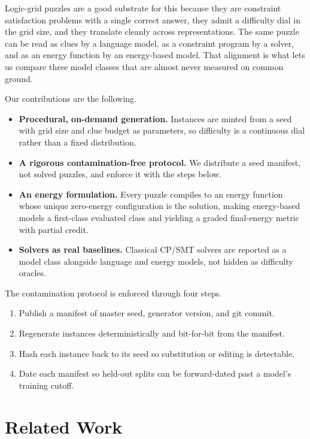 \documentclass[11pt]{article}
\begin{document}
Logic-grid puzzles are a good substrate for this because they are constraint
satisfaction problems with a single correct answer, they admit a difficulty dial
in the grid size, and they translate cleanly across representations. The same
puzzle can be read as clues by a language model, as a constraint program by a
solver, and as an energy function by an energy-based model. That alignment is what
lets us compare three model classes that are almost never measured on common
ground.

Our contributions are the following.

\begin{itemize}
  \item \textbf{Procedural, on-demand generation.} Instances are minted from a
  seed with grid size and clue budget as parameters, so difficulty is a
  continuous dial rather than a fixed distribution.
  \item \textbf{A rigorous contamination-free protocol.} We distribute a seed
  manifest, not solved puzzles, and enforce it with the steps below.
  \item \textbf{An energy formulation.} Every puzzle compiles to an energy
  function whose unique zero-energy configuration is the solution, making
  energy-based models a first-class evaluated class and yielding a graded
  final-energy metric with partial credit.
  \item \textbf{Solvers as real baselines.} Classical CP/SMT solvers are reported
  as a model class alongside language and energy models, not hidden as difficulty
  oracles.
\end{itemize}

The contamination protocol is enforced through four steps.

\begin{enumerate}
  \item Publish a manifest of master seed, generator version, and git commit.
  \item Regenerate instances deterministically and bit-for-bit from the manifest.
  \item Hash each instance back to its seed so substitution or editing is
  detectable.
  \item Date each manifest so held-out splits can be forward-dated past a model's
  training cutoff.
\end{enumerate}

\section{Related Work}
\end{document}
